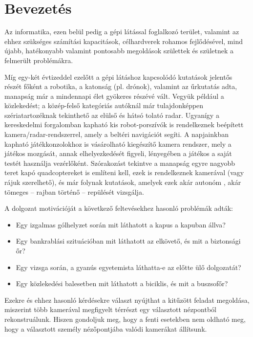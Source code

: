 \chapter*{Bevezetés}

Az informatika, ezen belül pedig a gépi látással foglalkozó terület, valamint az ehhez szükséges számítási kapacitások, célhardverek rohamos fejlődésével, mind újabb, hatékonyabb valamint pontosabb megoldások születtek és születnek a felmerült problémákra.

Míg egy-két évtizeddel ezelőtt a gépi látáshoz kapcsolódó kutatások jelentős részét főként a robotika, a katonság (pl. drónok), valamint az űrkutatás adta, manapság már a mindennapi élet gyökeres részévé vált. Vegyük például a közlekedést; a közép-felső kategóriás autóknál már tulajdonképpen szériatartozéknak tekinthető az elülső és hátsó tolató radar. Ugyanígy a kereskedelmi forgalomban kapható kis robot-porszívók is rendelkeznek beépített kamera/radar-rendszerrel, amely a beltéri navigációt segíti. A napjainkban kapható játékkonzolokhoz is vásárolható kiegészítő kamera rendszer, mely a játékos mozgását, annak elhelyezkedését figyeli, lényegében a játékos a saját testét használja vezérlőként. Szórakozást tekintve a manapság egyre nagyobb teret kapó quadcoptereket \cite{quadropter} is említeni kell, ezek is rendelkeznek kamerával (vagy rájuk szerelhető), és már folynak kutatások, amelyek ezek akár autonóm \cite{quad-autonomous}, akár tömeges \cite{quad-swarm} -- rajban történő -- repülését vizsgálja.

A dolgozat motivációját a következő feltevésekhez hasonló problémák adták:
\begin{itemize}
\item Egy izgalmas gólhelyzet során mit láthatott a kapus a kapuban állva?
\item Egy bankrablási szituációban mit láthatott az elkövető, és mit a biztonsági őr?
\item Egy vizsga során, a gyanús egyetemista láthatta-e az előtte ülő dolgozatát?
\item Egy közlekedési balesetben mit láthatott a biciklis, és mit a buszsofőr?
\end{itemize}

Ezekre és ehhez hasonló kérdésekre választ nyújthat a kitűzött feladat megoldása, miszerint több kamerával megfigyelt térrészt egy választott nézpontból rekonstruálunk. Hiszen gondoljuk meg, hogy a fenti esetekben nem oldható meg, hogy a választott személy nézőpontjába valódi kamerákat állítsunk.

